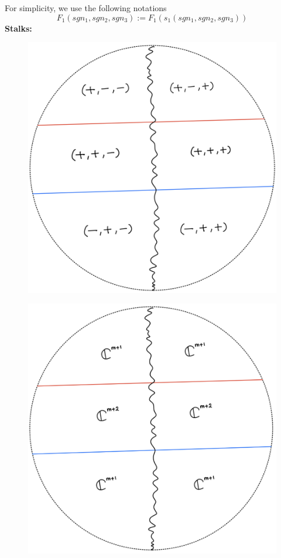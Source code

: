 For simplicity, we use the following notations
\[
F_1(sgn_1,sgn_2,sgn_3):= F_1(s_1(sgn_1,sgn_2,sgn_3))
\]
\textbf{Stalks:}
\begin{figure}[H]
    \centering
    \includegraphics[scale = 0.45]{diagrams/lemma3/31.png} 
    \caption{}
    \label{fig:your-label}
\end{figure}
\begin{figure}[H]
    \centering
    \includegraphics[scale = 0.45]{diagrams/lemma3/32.png} 
    \caption{}
    \label{fig:your-label}
\end{figure}
